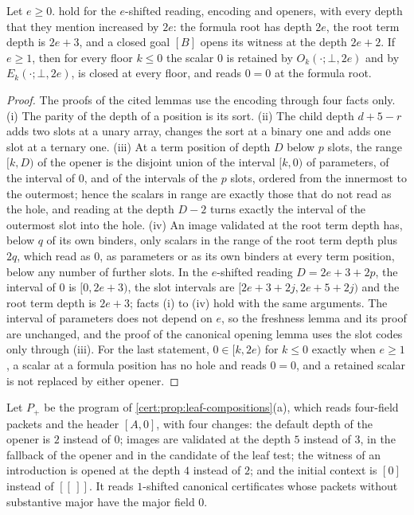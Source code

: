 \begin{lemma}\label{cert:lem:offset}
Let $e\ge 0$. 
hold for the $e$-shifted reading, encoding and openers, with every depth that
they mention increased by $2e$: the formula root has depth $2e$, the root term
depth is $2e+3$, and a closed goal $[B]$ opens its witness at the depth
$2e+2$. If $e\ge 1$, then for every floor $k\le 0$ the scalar $0$ is retained by
$O_k(\cdot;\bot,2e)$ and by $E_k(\cdot;\bot,2e)$, is closed at every floor, and
reads $0=0$ at the formula root.
\end{lemma}
\begin{proof}
The proofs of the cited lemmas use the encoding through four facts only.
(i) The parity of the depth of a position is its sort. (ii) The child depth
$d+5-r$ adds two slots at a unary array, changes the sort at a binary one and
adds one slot at a ternary one. (iii) At a term position of depth $D$ below
$p$ slots, the range $[k,D)$ of the opener is the disjoint union of the
interval $[k,0)$ of parameters, of the interval of $0$, and of the intervals of
the $p$ slots, ordered from the innermost to the outermost; hence the scalars
in range are exactly those that do not read as the hole, and reading at the
depth $D-2$ turns exactly the interval of the outermost slot into the hole.
(iv) An image validated at the root term depth has, below $q$ of its own
binders, only scalars in the range of the root term depth plus $2q$, which read
as $0$, as parameters or as its own binders at every term position, below any
number of further slots. In the $e$-shifted reading $D=2e+3+2p$, the interval
of $0$ is $[0,2e+3)$, the slot intervals are $[2e+3+2j,2e+5+2j)$ and the root
term depth is $2e+3$; facts (i) to (iv) hold with the same arguments. The
interval of parameters does not depend on $e$, so the freshness lemma and its
proof are unchanged, and the proof of the canonical opening lemma uses the slot
codes only through (iii). For the last statement, $0\in[k,2e)$ for $k\le 0$
exactly when $e\ge 1$, a scalar at a formula position has no hole and reads
$0=0$, and a retained scalar is not replaced by either opener.
\end{proof}

Let $P_{+}$ be the program of \cref{cert:prop:leaf-compositions}(a), which
reads four-field packets and the header $[A,0]$, with four changes: the
default depth of the opener is $2$ instead of $0$; images are validated at the
depth $5$ instead of $3$, in the fallback of the opener and in the candidate
of the leaf test; the witness of an introduction is opened at the depth $4$
instead of $2$; and the initial context is $[0]$ instead of $[[\,]]$. It reads
$1$-shifted canonical certificates whose packets without substantive major have
the major field $0$.

